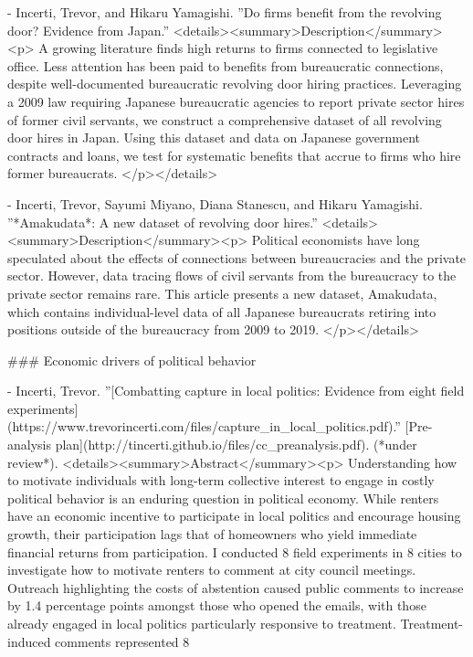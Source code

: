 - Incerti, Trevor, and Hikaru Yamagishi. ''Do firms benefit from the revolving door? Evidence from Japan.''
   <details><summary>Description</summary><p> A growing literature finds high returns to firms connected to legislative office. Less attention has been paid to benefits from bureaucratic connections, despite well-documented bureaucratic revolving door hiring practices. Leveraging a 2009 law requiring Japanese bureaucratic agencies to report private sector hires of former civil servants, we construct a comprehensive dataset of all revolving door hires in Japan. Using this dataset and data on Japanese government contracts and loans, we test for systematic benefits that accrue to firms who hire former bureaucrats. </p></details>
 
- Incerti, Trevor, Sayumi Miyano, Diana Stanescu, and Hikaru Yamagishi. ''*Amakudata*: A new dataset of revolving door hires.''
   <details><summary>Description</summary><p> Political economists have long speculated about the effects of connections between bureaucracies and the private sector. However, data tracing flows of civil servants from the bureaucracy to the private sector remains rare. This article presents a new dataset, Amakudata, which contains individual-level data of all Japanese bureaucrats retiring into positions outside of the bureaucracy from 2009 to 2019. </p></details>
  

### Economic drivers of political behavior
  
  - Incerti, Trevor. ''[Combatting capture in local politics: Evidence from eight field experiments](https://www.trevorincerti.com/files/capture_in_local_politics.pdf).'' [Pre-analysis plan](http://tincerti.github.io/files/cc_preanalysis.pdf). (*under review*).   
   <details><summary>Abstract</summary><p> Understanding how to motivate individuals with long-term collective interest to engage in costly political behavior is an enduring question in political economy. While renters have an economic incentive to participate in local politics and encourage housing growth, their participation lags that of homeowners who yield immediate financial returns from participation. I conducted 8 field experiments in 8 cities to investigate how to motivate renters to comment at city council meetings. Outreach highlighting the costs of abstention caused public comments to increase by 1.4 percentage points amongst those who opened the emails, with those already engaged in local politics particularly responsive to treatment. Treatment-induced comments represented 8%
   

